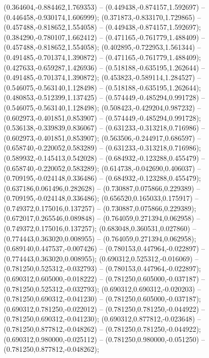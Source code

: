  (0.364604,-0.884462,1.769353) -- (0.449438,-0.874157,1.592697) -- (0.446458,-0.930174,1.606999);
 (0.371873,-0.833170,1.729865) -- (0.457488,-0.818652,1.554058) -- (0.449438,-0.874157,1.592697);
 (0.384290,-0.780107,1.662412) -- (0.471165,-0.761779,1.488409) -- (0.457488,-0.818652,1.554058);
 (0.402895,-0.722953,1.561344) -- (0.491485,-0.701374,1.390872) -- (0.471165,-0.761779,1.488409);
 (0.427633,-0.659287,1.426936) -- (0.518188,-0.635195,1.262644) -- (0.491485,-0.701374,1.390872);
 (0.453823,-0.589114,1.284527) -- (0.546075,-0.563140,1.128498) -- (0.518188,-0.635195,1.262644);
 (0.480853,-0.512399,1.137425) -- (0.574449,-0.485294,0.991728) -- (0.546075,-0.563140,1.128498);
 (0.508423,-0.429204,0.987232) -- (0.602973,-0.401851,0.853907) -- (0.574449,-0.485294,0.991728);
 (0.536138,-0.339839,0.836067) -- (0.631233,-0.313218,0.716986) -- (0.602973,-0.401851,0.853907);
 (0.563506,-0.244917,0.686597) -- (0.658740,-0.220052,0.583289) -- (0.631233,-0.313218,0.716986);
 (0.589932,-0.145413,0.542028) -- (0.684932,-0.123288,0.455479) -- (0.658740,-0.220052,0.583289);
 (0.614738,-0.042690,0.406037) -- (0.709195,-0.024148,0.336486) -- (0.684932,-0.123288,0.455479);
 (0.637186,0.061496,0.282628) -- (0.730887,0.075866,0.229389) -- (0.709195,-0.024148,0.336486);
 (0.656520,0.165033,0.175917) -- (0.749372,0.175016,0.137257) -- (0.730887,0.075866,0.229389);
 (0.672017,0.265546,0.089848) -- (0.764059,0.271394,0.062958) -- (0.749372,0.175016,0.137257);
 (0.683048,0.360531,0.027860) -- (0.774443,0.363020,0.008955) -- (0.764059,0.271394,0.062958);
 (0.689140,0.447537,-0.007426) -- (0.780153,0.447964,-0.022897) -- (0.774443,0.363020,0.008955);
 (0.690312,0.525312,-0.016069) -- (0.781250,0.525312,-0.032793) -- (0.780153,0.447964,-0.022897);
 (0.690312,0.605000,-0.018222) -- (0.781250,0.605000,-0.037187) -- (0.781250,0.525312,-0.032793);
 (0.690312,0.690312,-0.020203) -- (0.781250,0.690312,-0.041230) -- (0.781250,0.605000,-0.037187);
 (0.690312,0.781250,-0.022012) -- (0.781250,0.781250,-0.044922) -- (0.781250,0.690312,-0.041230);
 (0.690312,0.877812,-0.023648) -- (0.781250,0.877812,-0.048262) -- (0.781250,0.781250,-0.044922);
 (0.690312,0.980000,-0.025112) -- (0.781250,0.980000,-0.051250) -- (0.781250,0.877812,-0.048262);
